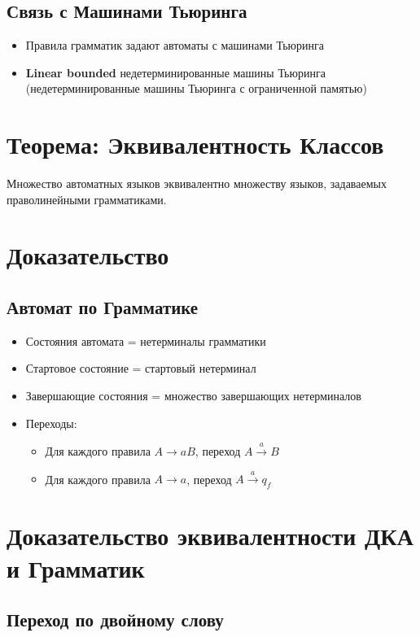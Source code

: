 \documentclass{article}
\begin{document}
\begin{itemize}
\begin{itemize}
\subsection{Связь с Машинами Тьюринга}
\begin{itemize}
\item Правила грамматик задают автоматы с машинами Тьюринга
\item \textbf{Linear bounded} недетерминированные машины Тьюринга (недетерминированные машины Тьюринга с ограниченной памятью)
\end{itemize}

\section{Теорема: Эквивалентность Классов}
Множество автоматных языков эквивалентно множеству языков, задаваемых праволинейными грамматиками.

\section{Доказательство}
\subsection{Автомат по Грамматике}
\begin{itemize}
\item Состояния автомата = нетерминалы грамматики
\item Стартовое состояние = стартовый нетерминал
\item Завершающие состояния = множество завершающих нетерминалов
\item Переходы:
    \begin{itemize}
    \item Для каждого правила $A \rightarrow aB$, переход $A \xrightarrow{a} B$
    \item Для каждого правила $A \rightarrow a$, переход $A \xrightarrow{a} q_f$
    \end{itemize}
\end{itemize}
\section{Доказательство эквивалентности ДКА и Грамматик}

\subsection{Переход по двойному слову}


\end{itemize}
\end{itemize}
\end{document}
